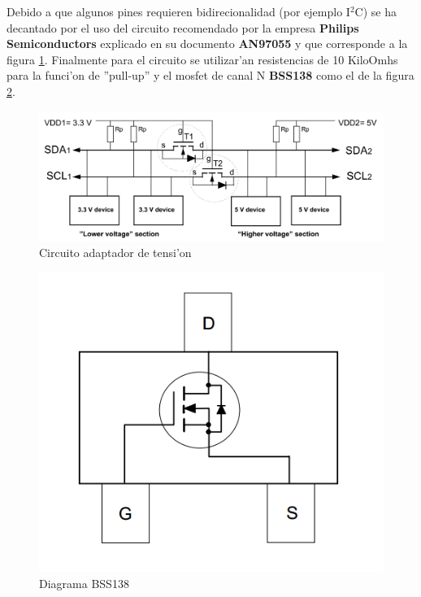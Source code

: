 \documentclass[twoside,12pt]{article}
\begin{document}
Debido a que algunos pines requieren bidirecionalidad (por ejemplo I${^2}$C) se ha decantado por el uso del circuito recomendado por la empresa \textbf{Philips Semiconductors} explicado en su documento \textbf{AN97055} y que corresponde a la figura \ref{fig:Level_shifter_circuit}. Finalmente para el circuito se utilizar'an resistencias de 10 KiloOmhs para la funci'on de ''pull-up'' y el mosfet de canal N \textbf{BSS138} como el de la figura \ref{fig:BSS138}.

\begin{figure}[ht]
\centering
\includegraphics[scale=0.30]{images/level_shifter_circuit.png}
\caption{Circuito adaptador de tensi'on}
\label{fig:Level_shifter_circuit}
\end{figure} 

\begin{figure}[ht]
\centering
\includegraphics[scale=0.35]{images/bss138_diagram.png}
\caption{Diagrama BSS138}
\label{fig:BSS138}
\end{figure} 
\end{document}
